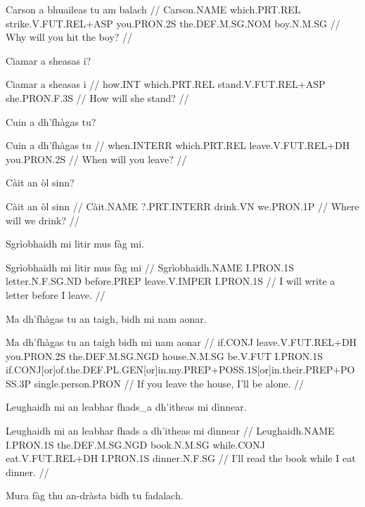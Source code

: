 \documentclass[a4paper,10pt]{article}
\begin{document}
\vspace{4mm}
\gla Carson a bhuaileas tu am balach  //
\glb Carson.NAME which.PRT.REL strike.V.FUT.REL+ASP you.PRON.2S the.DEF.M.SG.NOM boy.N.M.SG  //
\glft Why will you hit the boy? //
\endgl
\xe

\ex
\begingl
\glpre Ciamar a sheasas i? 

\vspace{4mm}
\gla Ciamar a sheasas i  //
\glb how.INT which.PRT.REL stand.V.FUT.REL+ASP she.PRON.F.3S  //
\glft How will she stand? //
\endgl
\xe

\ex
\begingl
\glpre Cuin a dh'fhàgas tu? 

\vspace{4mm}
\gla Cuin a dh'fhàgas tu  //
\glb when.INTERR which.PRT.REL leave.V.FUT.REL+DH you.PRON.2S  //
\glft When will you leave? //
\endgl
\xe

\ex
\begingl
\glpre Càit an òl sinn? 

\vspace{4mm}
\gla Càit an òl sinn  //
\glb Càit.NAME ?.PRT.INTERR drink.VN we.PRON.1P  //
\glft Where will we drink? //
\endgl
\xe

\ex
\begingl
\glpre Sgrìobhaidh mi litir mus fàg mi. 

\vspace{4mm}
\gla Sgrìobhaidh mi litir mus fàg mi  //
\glb Sgrìobhaidh.NAME I.PRON.1S letter.N.F.SG.ND before.PREP leave.V.IMPER I.PRON.1S  //
\glft I will write a letter before I leave. //
\endgl
\xe

\ex
\begingl
\glpre Ma dh'fhàgas tu an taigh, bidh mi nam aonar. 

\vspace{4mm}
\gla Ma dh'fhàgas tu an taigh bidh mi nam aonar  //
\glb if.CONJ leave.V.FUT.REL+DH you.PRON.2S the.DEF.M.SG.NGD house.N.M.SG be.V.FUT I.PRON.1S if.CONJ[or]of.the.DEF.PL.GEN[or]in.my.PREP+POSS.1S[or]in.their.PREP+POSS.3P single.person.PRON  //
\glft If you leave the house, I'll be alone. //
\endgl
\xe

\ex
\begingl
\glpre Leughaidh mi an leabhar fhads\_a dh'itheas mi dìnnear. 

\vspace{4mm}
\gla Leughaidh mi an leabhar {fhads a} dh'itheas mi dìnnear  //
\glb Leughaidh.NAME I.PRON.1S the.DEF.M.SG.NGD book.N.M.SG while.CONJ eat.V.FUT.REL+DH I.PRON.1S dinner.N.F.SG  //
\glft I'll read the book while I eat dinner. //
\endgl
\xe

\ex
\begingl
\glpre Mura fàg thu an-dràsta bidh tu fadalach. 
\end{document}
